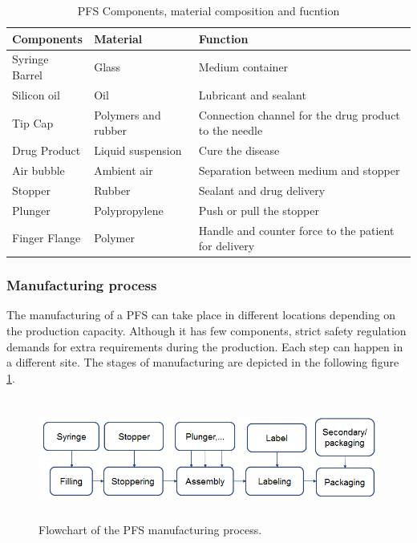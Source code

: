 \begin{table}[h]
\def\arraystretch{1.4}
\caption{PFS Components, material composition and fucntion}
	\begin{tabular}{p{2.6cm} p{3.7cm}p{9cm}}
	Components & Material & Function \\
    \hline
Syringe Barrel  & Glass         & Medium container \\
Silicon oil     & Oil           & Lubricant and sealant \\
Tip Cap         & Polymers and rubber & Connection channel for the drug product to the needle\\
Drug Product    & Liquid suspension & Cure the disease\\
Air bubble      & Ambient air   & Separation between medium and stopper \\  
Stopper         & Rubber        & Sealant and drug delivery\\  
Plunger         & Polypropylene & Push or pull the stopper\\
Finger Flange & Polymer & Handle and counter force to the patient for delivery\\
\hline
	\end{tabular}
\end{table}
\newpage
\subsubsection{Manufacturing process}

The manufacturing of a PFS can take place in different locations depending on the production capacity. Although it has few components, strict safety regulation demands for extra requirements during the production. Each step can happen in a different site. 
The stages of manufacturing are depicted in the following figure \ref{fgr:manu}.

\begin{figure}[h]	
	\centering
\includegraphics[height=4cm]{img/pfs_manu.PNG}
   \caption{Flowchart of the PFS manufacturing process.}
 \label{fgr:manu}
\end{figure}

